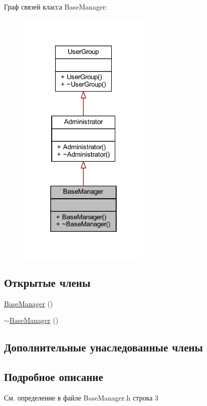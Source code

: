 Граф связей класса Base\+Manager\+:\nopagebreak
\begin{figure}[H]
\begin{center}
\leavevmode
\includegraphics[width=178pt]{d8/d95/class_base_manager__coll__graph}
\end{center}
\end{figure}
\subsection*{Открытые члены}
\begin{DoxyCompactItemize}
\item 
\hyperlink{class_base_manager_a663ef30d41792bdecf2598a6285cfddd}{Base\+Manager} ()
\item 
\hyperlink{class_base_manager_af512e2d3b2a7727a2766a6c95a6b90a3}{$\sim$\+Base\+Manager} ()
\end{DoxyCompactItemize}
\subsection*{Дополнительные унаследованные члены}


\subsection{Подробное описание}


См. определение в файле Base\+Manager.\+h строка 3



